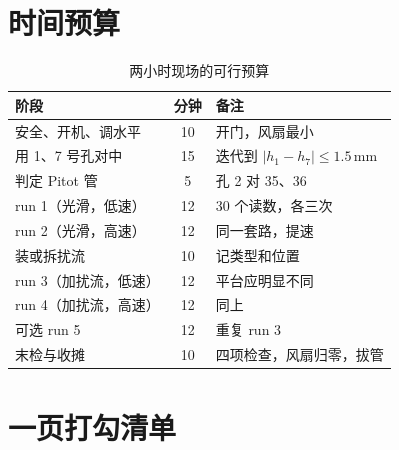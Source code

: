 \documentclass[11pt,a4paper]{ctexart}
\begin{document}
\section{时间预算}

\begin{table}[H]
\centering
\caption{两小时现场的可行预算}
\small
\begin{tabularx}{\textwidth}{@{}X c p{7.4cm}@{}}
\toprule
阶段 & 分钟 & 备注 \\
\midrule
安全、开机、调水平 & 10 & 开门，风扇最小 \\
用 1、7 号孔对中 & 15 & 迭代到 $|h_1 - h_7| \leq 1.5$\,mm \\
判定 Pitot 管 & 5 & 孔 2 对 35、36 \\
run 1（光滑，低速） & 12 & 30 个读数，各三次 \\
run 2（光滑，高速） & 12 & 同一套路，提速 \\
装或拆扰流 & 10 & 记类型和位置 \\
run 3（加扰流，低速） & 12 & 平台应明显不同 \\
run 4（加扰流，高速） & 12 & 同上 \\
可选 run 5 & 12 & 重复 run 3 \\
末检与收摊 & 10 & 四项检查，风扇归零，拔管 \\
\bottomrule
\end{tabularx}
\end{table}

\section{一页打勾清单}
\end{document}
